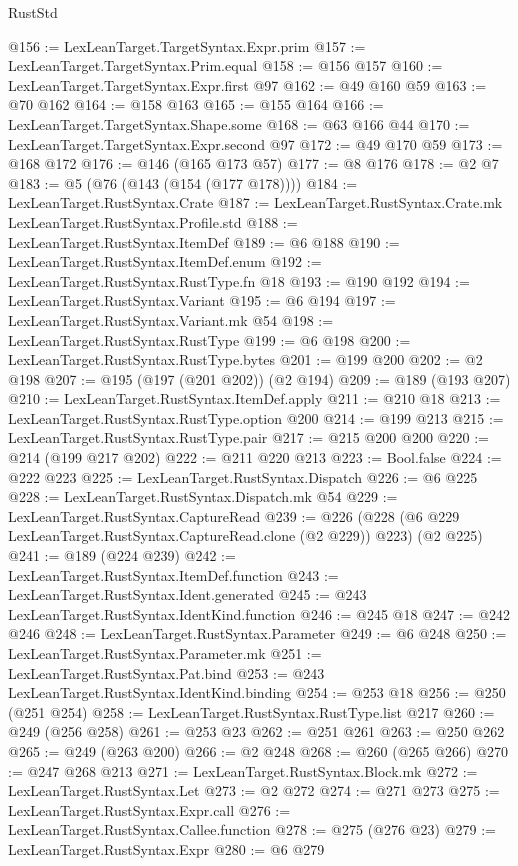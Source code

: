 \begin{lexlean}{RustStd}
\begin{coremodule}
@156 := LexLeanTarget.TargetSyntax.Expr.prim
@157 := LexLeanTarget.TargetSyntax.Prim.equal
@158 := @156 @157
@160 := LexLeanTarget.TargetSyntax.Expr.first @97
@162 := @49 @160 @59
@163 := @70 @162
@164 := @158 @163
@165 := @155 @164
@166 := LexLeanTarget.TargetSyntax.Shape.some
@168 := @63 @166 @44
@170 := LexLeanTarget.TargetSyntax.Expr.second @97
@172 := @49 @170 @59
@173 := @168 @172
@176 := @146 (@165 @173 @57)
@177 := @8 @176
@178 := @2 @7
@183 := @5 (@76 (@143 (@154 (@177 @178))))
@184 := LexLeanTarget.RustSyntax.Crate
@187 := LexLeanTarget.RustSyntax.Crate.mk LexLeanTarget.RustSyntax.Profile.std
@188 := LexLeanTarget.RustSyntax.ItemDef
@189 := @6 @188
@190 := LexLeanTarget.RustSyntax.ItemDef.enum
@192 := LexLeanTarget.RustSyntax.RustType.fn @18
@193 := @190 @192
@194 := LexLeanTarget.RustSyntax.Variant
@195 := @6 @194
@197 := LexLeanTarget.RustSyntax.Variant.mk @54
@198 := LexLeanTarget.RustSyntax.RustType
@199 := @6 @198
@200 := LexLeanTarget.RustSyntax.RustType.bytes
@201 := @199 @200
@202 := @2 @198
@207 := @195 (@197 (@201 @202)) (@2 @194)
@209 := @189 (@193 @207)
@210 := LexLeanTarget.RustSyntax.ItemDef.apply
@211 := @210 @18
@213 := LexLeanTarget.RustSyntax.RustType.option @200
@214 := @199 @213
@215 := LexLeanTarget.RustSyntax.RustType.pair
@217 := @215 @200 @200
@220 := @214 (@199 @217 @202)
@222 := @211 @220 @213
@223 := Bool.false
@224 := @222 @223
@225 := LexLeanTarget.RustSyntax.Dispatch
@226 := @6 @225
@228 := LexLeanTarget.RustSyntax.Dispatch.mk @54
@229 := LexLeanTarget.RustSyntax.CaptureRead
@239 := @226 (@228 (@6 @229 LexLeanTarget.RustSyntax.CaptureRead.clone (@2 @229)) @223) (@2 @225)
@241 := @189 (@224 @239)
@242 := LexLeanTarget.RustSyntax.ItemDef.function
@243 := LexLeanTarget.RustSyntax.Ident.generated
@245 := @243 LexLeanTarget.RustSyntax.IdentKind.function
@246 := @245 @18
@247 := @242 @246
@248 := LexLeanTarget.RustSyntax.Parameter
@249 := @6 @248
@250 := LexLeanTarget.RustSyntax.Parameter.mk
@251 := LexLeanTarget.RustSyntax.Pat.bind
@253 := @243 LexLeanTarget.RustSyntax.IdentKind.binding
@254 := @253 @18
@256 := @250 (@251 @254)
@258 := LexLeanTarget.RustSyntax.RustType.list @217
@260 := @249 (@256 @258)
@261 := @253 @23
@262 := @251 @261
@263 := @250 @262
@265 := @249 (@263 @200)
@266 := @2 @248
@268 := @260 (@265 @266)
@270 := @247 @268 @213
@271 := LexLeanTarget.RustSyntax.Block.mk
@272 := LexLeanTarget.RustSyntax.Let
@273 := @2 @272
@274 := @271 @273
@275 := LexLeanTarget.RustSyntax.Expr.call
@276 := LexLeanTarget.RustSyntax.Callee.function
@278 := @275 (@276 @23)
@279 := LexLeanTarget.RustSyntax.Expr
@280 := @6 @279

\end{coremodule}
\end{lexlean}
